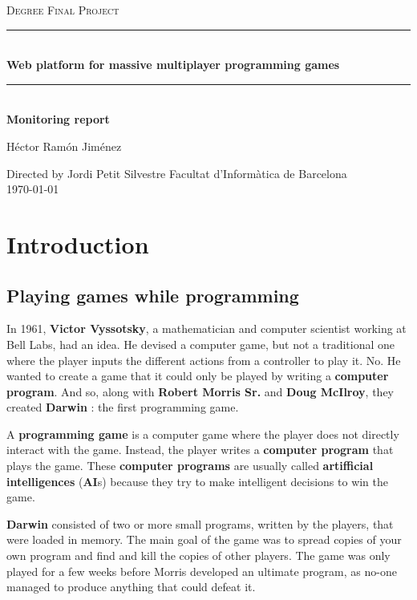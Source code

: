 \documentclass[a4paper,11pt]{article}
\begin{document}
\begin{titlepage}
\begin{center}
\textsc{\Large Degree Final Project}
\\[1.5cm]
\rule{\linewidth}{0.5mm}
\\[0.4cm]
{\huge
\bfseries
Web platform for massive multiplayer programming games
\\[0.4cm]
}
\rule{\linewidth}{0.5mm}
\\[0.3cm]
{\bfseries
Monitoring report
}
\\[2.5cm]
\begin{center}
\large
Héctor Ramón Jiménez
\end{center}
Directed by Jordi Petit Silvestre
\vfill
{\large
Facultat d'Informàtica de Barcelona
}
\\[0.5cm]
{\large
\today
}
\end{center}
\end{titlepage}
\clearpage
\tableofcontents
\clearpage
\section{Introduction}
\subsection{Playing games while programming}
In 1961, \textbf{Victor Vyssotsky}, a mathematician and computer scientist working at Bell Labs, had an idea. He devised
a computer game, but not a traditional one where the player inputs the different actions from a controller to play it.
No. He wanted to create a game that it could only be played by writing a \textbf{computer program}. And so, along with \textbf{Robert
Morris Sr.} and \textbf{Doug McIlroy}, they created \textbf{Darwin} \cite{darwin}: the first programming game.

A \textbf{programming game} is a computer game where the player does not directly interact with the game. Instead, the
player writes a \textbf{computer program} that plays the game. These \textbf{computer programs} are usually called \textbf{artifficial
intelligences} (\textbf{AI}s) because they try to make intelligent decisions to win the game.

\textbf{Darwin} consisted of two or more small programs, written by the players, that were loaded in memory. The main goal
of the game was to spread copies of your own program and find and kill the copies of other players. The game was only
played for a few weeks before Morris developed an ultimate program, as no-one managed to produce anything that could
defeat it.
\end{document}
